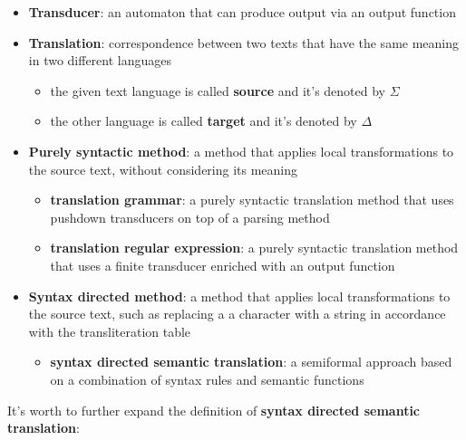 \documentclass[english]{article}
\begin{document}
\begin{itemize}
  \item \textbf{Transducer}: an automaton that can produce output via an output function
  \item \textbf{Translation}: correspondence between two texts that have the same meaning in two different languages
        \begin{itemize}
          \item the given text language is called \textbf{source} and it's denoted by \(\Sigma\)
          \item the other language is called \textbf{target} and it's denoted by \(\Delta\)
        \end{itemize}
  \item \textbf{Purely syntactic method}: a method that applies local transformations to the source text, without considering its meaning
        \begin{itemize}
          \item \textbf{translation grammar}: a purely syntactic translation method that uses pushdown transducers on top of a parsing method
          \item \textbf{translation regular expression}: a purely syntactic translation method that uses a finite transducer enriched with an output function
        \end{itemize}
  \item \textbf{Syntax directed method}: a method that applies local transformations to the source text, such as replacing a a character with a string in accordance with the transliteration table
        \begin{itemize}
          \item \textbf{syntax directed semantic translation}: a semiformal approach based on a combination of syntax rules and semantic functions
        \end{itemize}
\end{itemize}

It's worth to further expand the definition of \textbf{syntax directed semantic translation}:
\end{document}
